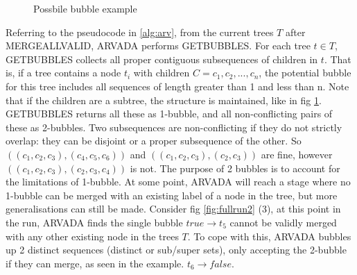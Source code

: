 \begin{figure}[H]
\centering
{}


\caption{Possbile bubble example}
\label{fig: possible bubble}
\end{figure}

Referring to the pseudocode in \ref{alg:arv}, from the current trees $T$ after MERGEALLVALID, ARVADA performs GETBUBBLES. For each tree $t \in T$, GETBUBBLES collects all proper contiguous subsequences of children in $t$. That is, if a tree contains a node $t_i$ with children $C = c_1, c_2,..., c_n$, the potential bubble for this tree includes all sequences of length greater than 1 and less than n. Note that if the children are a subtree, the structure is maintained, like in fig \ref{fig: possible bubble}. GETBUBBLES returns all these as 1-bubble, and all non-conflicting pairs of these as 2-bubbles. Two subsequences are non-conflicting if they do not strictly overlap: they can be disjoint or a proper subsequence of the other. So $((c_1, c_2, c_3), (c_4, c_5, c_6))$ and $((c_1, c_2, c_3), (c_2, c_3))$ are fine, however $((c_1, c_2, c_3), (c_2, c_3, c_4))$ is not. The purpose of 2 bubbles is to account for the limitations of 1-bubble. At some point, ARVADA will reach a stage where no 1-bubble can be merged with an existing label of a node in the tree, but more generalisations can still be made. Consider fig \ref{fig:fullrun2} (3), at this point in the run, ARVADA finds the single bubble $true \rightarrow t_5$ cannot be validly merged with any other existing node in the trees $T$. To cope with this, ARVADA bubbles up 2 distinct sequences (distinct or sub/super sets), only accepting the 2-bubble if they can merge, as seen in the example. $t_6 \rightarrow false$. 
\vspace{\baselineskip}


